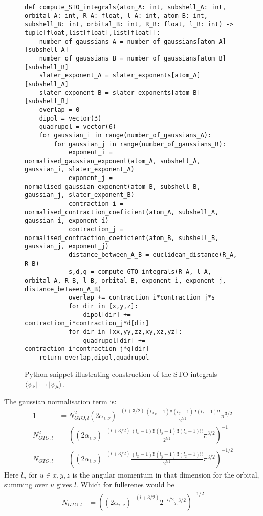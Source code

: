 \begin{figure}[H]
\begin{verbatim}
def compute_STO_integrals(atom_A: int, subshell_A: int, orbital_A: int, R_A: float, l_A: int, atom_B: int, subshell_B: int, orbital_B: int, R_B: float, l_B: int) -> tuple[float,list[float],list[float]]:
    number_of_gaussians_A = number_of_gaussians[atom_A][subshell_A]
    number_of_gaussians_B = number_of_gaussians[atom_B][subshell_B]
    slater_exponent_A = slater_exponents[atom_A][subshell_A]
    slater_exponent_B = slater_exponents[atom_B][subshell_B]
    overlap = 0
    dipol = vector(3)
    quadrupol = vector(6)
    for gaussian_i in range(number_of_gaussians_A):
        for gaussian_j in range(number_of_gaussians_B):
            exponent_i = normalised_gaussian_exponent(atom_A, subshell_A, gaussian_i, slater_exponent_A)
            exponent_j = normalised_gaussian_exponent(atom_B, subshell_B, gaussian_j, slater_exponent_B)
            contraction_i = normalised_contraction_coeficient(atom_A, subshell_A, gaussian_i, exponent_i)
            contraction_j = normalised_contraction_coeficient(atom_B, subshell_B, gaussian_j, exponent_j)
            distance_between_A_B = euclidean_distance(R_A, R_B)
            s,d,q = compute_GTO_integrals(R_A, l_A, orbital_A, R_B, l_B, orbital_B, exponent_i, exponent_j, distance_between_A_B)
            overlap += contraction_i*contraction_j*s
            for dir in [x,y,z]:
                dipol[dir] += contraction_i*contraction_j*d[dir]
            for dir in [xx,yy,zz,xy,xz,yz]:
                quadrupol[dir] += contraction_i*contraction_j*q[dir]
    return overlap,dipol,quadrupol
\end{verbatim}
    \caption{Python snippet illustrating construction of the STO integrals $\braket{\psi_\nu|\cdots|\psi_\mu}$.}
\end{figure}

The gaussian normalisation term\cite[eq. 5.55]{daudel1983} is:
\begin{align}
    1&=N_{GTO,l}^2(2\alpha_{i,\nu})^{-(l+3/2)}\frac{({l_A}_x-1)!!({l}_y-1)!!({l}_z-1)!!}{2^{l/2}}\pi^{3/2}\\
    N_{GTO,l}^2&=\left((2\alpha_{i,\nu})^{-(l+3/2)}\frac{({l}_x-1)!!({l}_y-1)!!({l}_z-1)!!}{2^{l/2}}\pi^{3/2}\right)^{-1}\\
    N_{GTO,l}&=\left((2\alpha_{i,\nu})^{-(l+3/2)}\frac{({l}_x-1)!!({l}_y-1)!!({l}_z-1)!!}{2^{l/2}}\pi^{3/2}\right)^{-1/2}
\end{align}
Here $l_u$ for $u\in x,y,z$ is the angular momentum in that dimension for the orbital, summing over $u$ gives $l$.
Which for fullerenes would be 
\begin{align}
    N_{GTO,l}&=\left((2\alpha_{i,\nu})^{-(l+3/2)}2^{-l/2}\pi^{3/2}\right)^{-1/2}
\end{align}

